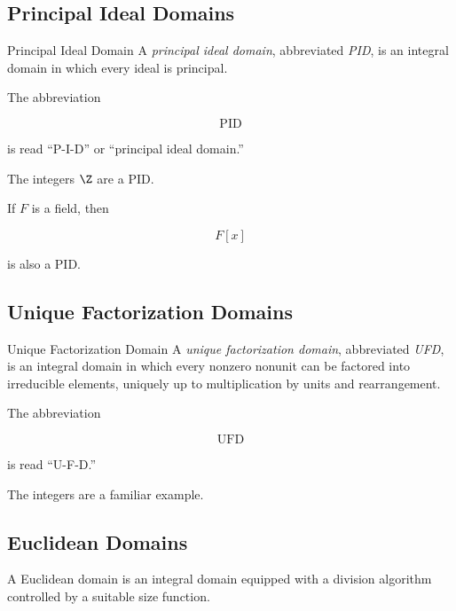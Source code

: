 \subsection{Principal Ideal Domains}
\label{subsec:principal-ideal-domains}

\begin{definitionbox}{Principal Ideal Domain}
A \emph{principal ideal domain}, abbreviated \emph{PID}, is an integral
domain in which every ideal is principal.
\end{definitionbox}

The abbreviation

\[ \mathrm{PID} \]

is read ``P-I-D'' or ``principal ideal domain.''

The integers \(\Z\) are a PID.

If \(F\) is a field, then

\[ F[x] \]

is also a PID.

\subsection{Unique Factorization Domains}
\label{subsec:unique-factorization-domains}

\begin{definitionbox}{Unique Factorization Domain}
A \emph{unique factorization domain}, abbreviated \emph{UFD}, is an integral
domain in which every nonzero nonunit can be factored into irreducible
elements, uniquely up to multiplication by units and rearrangement.
\end{definitionbox}

The abbreviation

\[ \mathrm{UFD} \]

is read ``U-F-D.''

The integers are a familiar example.

\subsection{Euclidean Domains}
\label{subsec:euclidean-domains}

A Euclidean domain is an integral domain equipped with a division algorithm
controlled by a suitable size function.

